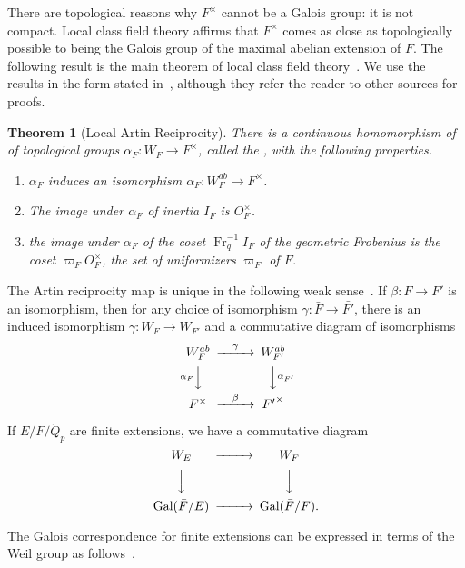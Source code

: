 \documentclass{amsart}
\newtheorem{theorem}[equation]{Theorem}
\def\op#1{{\operatorname{#1}}}
\def\oG{\op{Gal}}
\begin{document}
There are topological reasons why $F^\times$ cannot be a Galois group: it is not
compact.  Local class field theory affirms that $F^\times$ comes as close as topologically
possible to being the Galois group of the maximal abelian extension of $F$.
The following result is the main theorem of local class field theory~\cite{CFT}.
We use the results in the form stated in~\cite{bushnell-henniart}, although they
refer the reader to other sources for proofs.

\begin{theorem}[Local Artin Reciprocity]  There is a continuous homomorphism of
of topological groups $\alpha_F:W_F\to F^\times$, called the , with the following properties.
\begin{enumerate}
\item $\alpha_F$ induces an isomorphism $\alpha_F:W^{ab}_F \to F^\times$.
\item The image under $\alpha_F$ of inertia $I_F$  is $O_F^\times$.
\item the image under $\alpha_F$ of the coset $\op{Fr}^{-1}_q I_F$ of
  the geometric Frobenius is the coset $\varpi_F O^\times_F$, the set of
  uniformizers $\varpi_F$ of $F$.
\end{enumerate}
\end{theorem}


The Artin reciprocity map is unique in the following weak
sense~\cite[29.1]{bushnell-henniart}.  If $\beta:F\to F'$ is an
isomorphism, then for any choice of isomorphism $\gamma:\bar{F}\to
\bar{F'}$, there is an induced isomorphism $\gamma:W_F\to W_{F'}$ and
a commutative diagram of isomorphisms
\[
\begin{CD}
W_F^{ab} @>\gamma>> W_{F'}^{ab}\\
@V\alpha_FVV @VV\alpha_{F'}V\\
F^\times @>\beta >> {F'}^\times
\end{CD}
\]

If $E/F/\ring{Q}_p$ are finite extensions, we have a commutative
diagram
\[
\begin{CD}
W_E @>>> W_F\\
@VVV @VVV\\
\oG(\bar{F}/E) @>>> \oG(\bar{F}/F).
\end{CD}
\]

The Galois correspondence for finite extensions can be expressed in terms of
the Weil group as follows~\cite[Prop. 28.5]{bushnell-henniart}.
\end{document}
